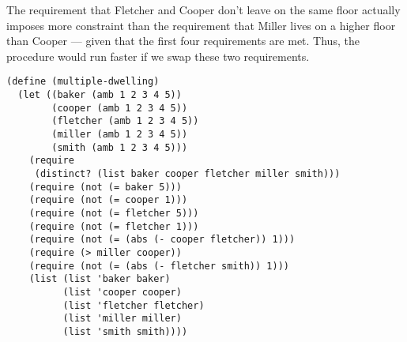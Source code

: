 \documentclass[a4paper,12pt]{article}
\begin{document}
The requirement that Fletcher and Cooper don't leave on the same floor
actually imposes more constraint than the requirement that
Miller lives on a higher floor than Cooper --- given that the first
four requirements are met.  Thus, the procedure would run faster if we
swap these two requirements.

\begin{lstlisting}
(define (multiple-dwelling)
  (let ((baker (amb 1 2 3 4 5))
        (cooper (amb 1 2 3 4 5))
        (fletcher (amb 1 2 3 4 5))
        (miller (amb 1 2 3 4 5))
        (smith (amb 1 2 3 4 5)))
    (require
     (distinct? (list baker cooper fletcher miller smith)))
    (require (not (= baker 5)))
    (require (not (= cooper 1)))
    (require (not (= fletcher 5)))
    (require (not (= fletcher 1)))
    (require (not (= (abs (- cooper fletcher)) 1)))
    (require (> miller cooper))
    (require (not (= (abs (- fletcher smith)) 1)))
    (list (list 'baker baker)
          (list 'cooper cooper)
          (list 'fletcher fletcher)
          (list 'miller miller)
          (list 'smith smith))))
\end{lstlisting}
\end{document}
